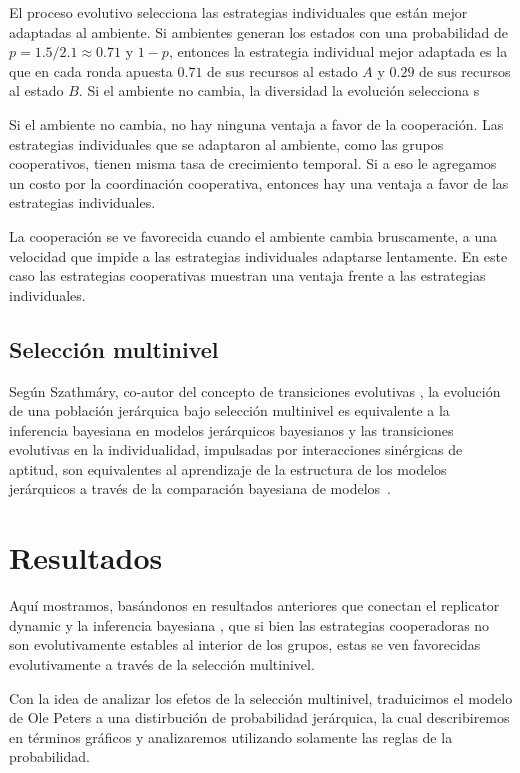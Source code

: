 \documentclass[a4paper,10pt]{article}
\begin{document}
El proceso evolutivo selecciona las estrategias individuales que están mejor adaptadas al ambiente.
Si ambientes generan los estados con una probabilidad de $p=1.5/2.1\approx 0.71$ y $1-p$, entonces la estrategia individual mejor adaptada es la que en cada ronda apuesta $0.71$ de sus recursos al estado $A$ y $0.29$ de sus recursos al estado $B$.
Si el ambiente no cambia, la diversidad la evolución selecciona s


Si el ambiente no cambia, no hay ninguna ventaja a favor de la cooperación.
Las estrategias individuales que se adaptaron al ambiente, como las grupos cooperativos, tienen misma tasa de crecimiento temporal.
Si a eso le agregamos un costo por la coordinación cooperativa, entonces hay una ventaja a favor de las estrategias individuales.

La cooperación se ve favorecida cuando el ambiente cambia bruscamente, a una velocidad que impide a las estrategias individuales adaptarse lentamente.
En este caso las estrategias cooperativas muestran una ventaja frente a las estrategias individuales.


\subsection{Selección multinivel}

Según Szathm\'ary, co-autor del concepto de transiciones evolutivas \cite{szathmary1995-evolutionaryTransitions, szathmary2015-evolutionaryTransitions}, la evolución de una población jerárquica bajo selección multinivel es equivalente a la inferencia bayesiana en modelos jerárquicos bayesianos y las transiciones evolutivas en la individualidad, impulsadas por interacciones sinérgicas de aptitud, son equivalentes al aprendizaje de la estructura de los modelos jerárquicos a través de la comparación bayesiana de modelos~\cite{czegel2019-bayesianEvolution}.


\section{Resultados}

Aquí mostramos, basándonos en resultados anteriores que conectan el replicator dynamic y la inferencia bayesiana \cite{}, que si bien las estrategias cooperadoras no son evolutivamente estables al interior de los grupos, estas se ven favorecidas evolutivamente a través de la selección multinivel.

Con la idea de analizar los efetos de la selección multinivel, traduicimos el modelo de Ole Peters a una distirbución de probabilidad jerárquica, la cual describiremos en términos gráficos y analizaremos utilizando solamente las reglas de la probabilidad.
\end{document}
